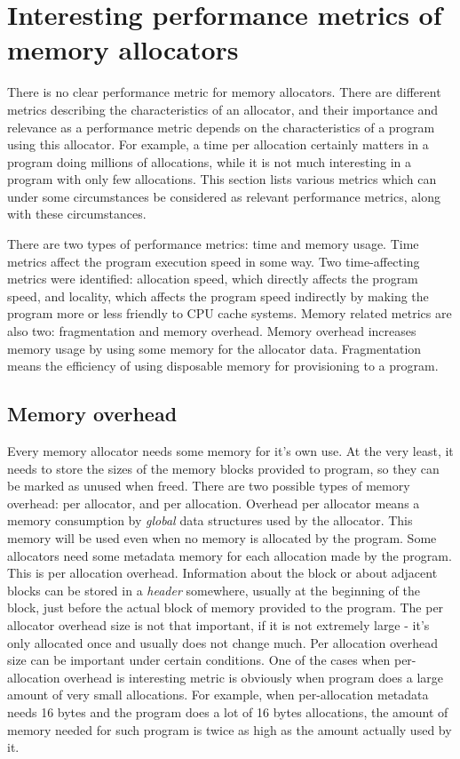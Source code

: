 \section{Interesting performance metrics of memory allocators}
\label{metrics}

There is no clear performance metric for memory allocators. There are different
metrics describing the characteristics of an allocator, and their importance and
relevance as a performance metric depends on the characteristics of a program
using this allocator. For example, a time per allocation certainly matters in a
program doing millions of allocations, while it is not much interesting in a
program with only few allocations. This section lists various metrics which can
under some circumstances be considered as relevant performance metrics, along
with these circumstances.

There are two types of performance metrics: time and memory usage. Time metrics
affect the program execution speed in some way. Two time-affecting metrics were
identified: allocation speed, which directly affects the program speed, and
locality, which affects the program speed indirectly by making the program more
or less friendly to CPU cache systems. Memory related metrics are also two:
fragmentation and memory overhead. Memory overhead increases memory usage by
using some memory for the allocator data. Fragmentation means the efficiency of
using disposable memory for provisioning to a program.

\subsection{Memory overhead}
\label{metrics:overhead}

Every memory allocator needs some memory for it's own use. At the very least, it
needs to store the sizes of the memory blocks provided to program, so they can be
marked as unused when freed. There are two possible types of memory overhead: per
allocator, and per allocation. Overhead per allocator means a memory consumption
by {\em global} data structures used by the allocator. This memory will be used
even when no memory is allocated by the program. Some allocators need some
metadata memory for each allocation made by the program. This is per allocation
overhead. Information about the block or about adjacent blocks can be stored in a
{\em header} somewhere, usually at the beginning of the block, just before the
actual block of memory provided to the program. The per allocator overhead size
is not that important, if it is not extremely large - it's only allocated once
and usually does not change much. Per allocation overhead size can be important
under certain conditions. One of the cases when per-allocation overhead is
interesting metric is obviously when program does a large amount of very small
allocations. For example, when per-allocation metadata needs 16 bytes and the
program does a lot of 16 bytes allocations, the amount of memory needed for such
program is twice as high as the amount actually used by it.

